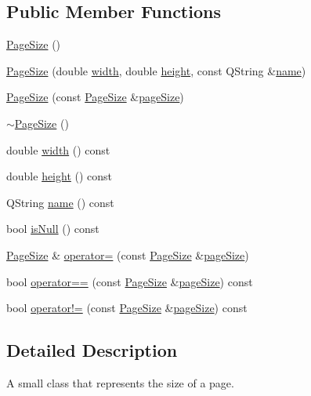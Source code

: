 \subsection*{Public Member Functions}
\begin{DoxyCompactItemize}
\item 
\hyperlink{classOkular_1_1PageSize_ad5c490f56fff0d987d9db2b6538d0ee3}{Page\+Size} ()
\item 
\hyperlink{classOkular_1_1PageSize_a7448b9c72e155fe549524a36ebce6d30}{Page\+Size} (double \hyperlink{classOkular_1_1PageSize_a8a2be3e61dc9f43b27946ffe2067ac55}{width}, double \hyperlink{classOkular_1_1PageSize_a78d47d2c41792dc3e05f094b40e3a197}{height}, const Q\+String \&\hyperlink{classOkular_1_1PageSize_a2083857cd82db104198342e4897862e4}{name})
\item 
\hyperlink{classOkular_1_1PageSize_a86e5777691c75fa0601f208e2f29d1d1}{Page\+Size} (const \hyperlink{classOkular_1_1PageSize}{Page\+Size} \&\hyperlink{classpageSize}{page\+Size})
\item 
\hyperlink{classOkular_1_1PageSize_a808c31a51a8dde37c797b8a7b0762fe6}{$\sim$\+Page\+Size} ()
\item 
double \hyperlink{classOkular_1_1PageSize_a8a2be3e61dc9f43b27946ffe2067ac55}{width} () const 
\item 
double \hyperlink{classOkular_1_1PageSize_a78d47d2c41792dc3e05f094b40e3a197}{height} () const 
\item 
Q\+String \hyperlink{classOkular_1_1PageSize_a2083857cd82db104198342e4897862e4}{name} () const 
\item 
bool \hyperlink{classOkular_1_1PageSize_a1f1a209158a4b2096fb820fea7ce7c52}{is\+Null} () const 
\item 
\hyperlink{classOkular_1_1PageSize}{Page\+Size} \& \hyperlink{classOkular_1_1PageSize_a2b7581c12d838a1e35c0cf1c91c803e8}{operator=} (const \hyperlink{classOkular_1_1PageSize}{Page\+Size} \&\hyperlink{classpageSize}{page\+Size})
\item 
bool \hyperlink{classOkular_1_1PageSize_a3ad2b86b8d812ba875657c0ebb8b63fb}{operator==} (const \hyperlink{classOkular_1_1PageSize}{Page\+Size} \&\hyperlink{classpageSize}{page\+Size}) const 
\item 
bool \hyperlink{classOkular_1_1PageSize_a19ec62a09b0339c244ccc4cb0c6c163a}{operator!=} (const \hyperlink{classOkular_1_1PageSize}{Page\+Size} \&\hyperlink{classpageSize}{page\+Size}) const 
\end{DoxyCompactItemize}


\subsection{Detailed Description}
A small class that represents the size of a page. 

